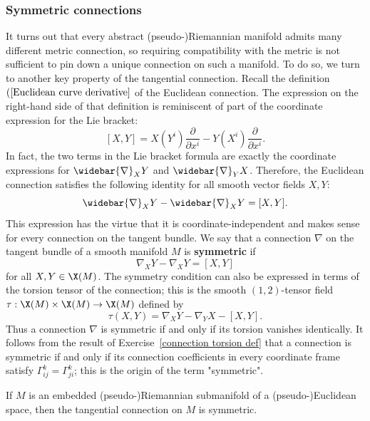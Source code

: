 \subsubsection{Symmetric connections}
It turns out that every abstract (pseudo-)Riemannian manifold admits many different metric connection, so requiring compatibility with the metric is not 
sufficient to pin down a unique connection on such a manifold. To do so, we turn to another key property of the tangential connection. Recall the definition $(\ref{Euclidean curve derivative}$ 
of  the Euclidean connection. The expression on the right-hand side of that definition is reminiscent of part of the coordinate expression for the Lie bracket:
\[[X,Y]=X(Y^i)\frac{\partial}{\partial x^i}-Y(X^i)\frac{\partial}{\partial x^i}.\]
In fact, the two terms in the Lie bracket formula are exactly the coordinate expressions for $\widebar{\nabla}_XY$ and $\widebar{\nabla}_YX$. Therefore, the Euclidean 
connection satisfies the following identity for all smooth vector fields $X,Y$:
\[\widebar{\nabla}_XY-\widebar{\nabla}_XY=[X,Y].\]
This expression has the virtue that it is coordinate-independent and makes sense for every connection on the tangent bundle. We say that a connection $\nabla$ on the 
tangent bundle of a smooth manifold $M$ is \textbf{symmetric} if
\[\nabla_XY-\nabla_XY=[X,Y]\]
for all $X,Y\in\X(M)$. The symmetry condition can also be expressed in terms of the torsion tensor of the connection; this is the smooth $(1,2)$-tensor field 
$\tau:\X(M)\times\X(M)\to\X(M)$ defined by
\[\tau(X,Y)=\nabla_XY-\nabla_YX-[X,Y].\]
Thus a connection $\nabla$ is symmetric if and only if its torsion vanishes identically. It follows from the result of Exercise~\ref{connection torsion def} that a connection is symmetric 
if and only if its connection coefficients in every coordinate frame satisfy $\Gamma_{ij}^k=\Gamma_{ji}^k$; this is the origin of the term "symmetric".
\begin{proposition}\label{Euclidean tangential connection symmetric}
If $M$ is an embedded (pseudo-)Riemannian submanifold of a (pseudo-)Euclidean space, then the tangential connection on $M$ is symmetric.
\end{proposition}
